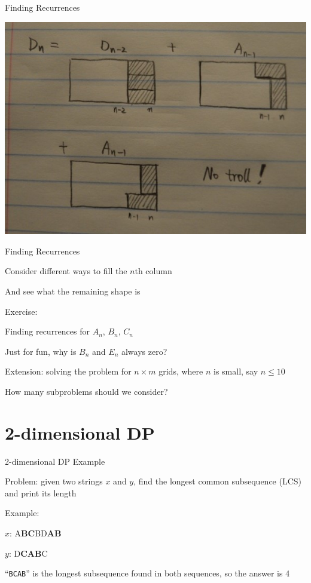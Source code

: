 \documentclass[13pt,onlymath]{beamer}
\begin{document}
\begin{frame}{Finding Recurrences}
\begin{center}
\includegraphics[height=0.7\textheight]{figures/tritiling_sub2}
\end{center}
\end{frame}

\begin{frame}{Finding Recurrences}
\BIT
\item Consider different ways to fill the $n$th column
\BIT \item And see what the remaining shape is \EIT
\item Exercise:
\BIT
\item Finding recurrences for $A_n$, $B_n$, $C_n$
\item Just for fun, why is $B_n$ and $E_n$ always zero?
\EIT
\vfill
\item Extension: solving the problem for $n \times m$ grids, where $n$ is small, say $n \le 10$
\BIT \item How many subproblems should we consider? \EIT
\EIT
\end{frame}

\section{2-dimensional DP}

\begin{frame}[fragile]{2-dimensional DP Example}
\BIT
\item Problem: given two strings $x$ and $y$, find the longest common subsequence (LCS) and print its length
\item Example:
\BIT
\item $x$: {\ttfamily A{\bfseries BC}BD{\bfseries AB}}
\item $y$: {D{\bfseries CAB}C}
\item ``\texttt{BCAB}'' is the longest subsequence found in both sequences, so the answer is 4
\EIT
\EIT
\end{frame}
\end{document}
